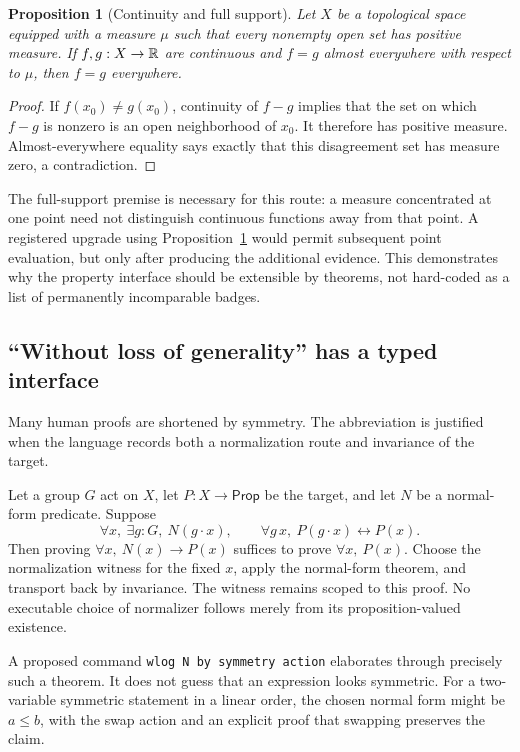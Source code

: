 \documentclass[11pt,a4paper]{article}
\newcommand{\code}[1]{\nolinkurl{#1}}
\theoremstyle{plain}
\newtheorem{proposition}[theorem]{Proposition}
\theoremstyle{definition}
\theoremstyle{remark}
\begin{document}
\begin{proposition}[Continuity and full support]\label{prop:ae}
Let $X$ be a topological space equipped with a measure $\mu$ such that every nonempty open set has positive measure. If $f,g:X\to\mathbb R$ are continuous and $f=g$ almost everywhere with respect to $\mu$, then $f=g$ everywhere.
\end{proposition}
\begin{proof}
If $f(x_0)\ne g(x_0)$, continuity of $f-g$ implies that the set on which $f-g$ is nonzero is an open neighborhood of $x_0$. It therefore has positive measure. Almost-everywhere equality says exactly that this disagreement set has measure zero, a contradiction.
\end{proof}
The full-support premise is necessary for this route: a measure concentrated at one point need not distinguish continuous functions away from that point. A registered upgrade using Proposition~\ref{prop:ae} would permit subsequent point evaluation, but only after producing the additional evidence. This demonstrates why the property interface should be extensible by theorems, not hard-coded as a list of permanently incomparable badges.

\subsection{``Without loss of generality'' has a typed interface}
Many human proofs are shortened by symmetry. The abbreviation is justified when the language records both a normalization route and invariance of the target.

Let a group $G$ act on $X$, let $P:X\to\mathsf{Prop}$ be the target, and let $N$ be a normal-form predicate. Suppose
\[
 \forall x,\ \exists g:G,\ N(g\cdot x),\qquad
 \forall g\,x,\ P(g\cdot x)\leftrightarrow P(x).
\]
Then proving $\forall x,\ N(x)\to P(x)$ suffices to prove $\forall x,\ P(x)$. Choose the normalization witness for the fixed $x$, apply the normal-form theorem, and transport back by invariance. The witness remains scoped to this proof. No executable choice of normalizer follows merely from its proposition-valued existence.

A proposed command \code{wlog N by symmetry action} elaborates through precisely such a theorem. It does not guess that an expression looks symmetric. For a two-variable symmetric statement in a linear order, the chosen normal form might be $a\le b$, with the swap action and an explicit proof that swapping preserves the claim.
\end{document}
